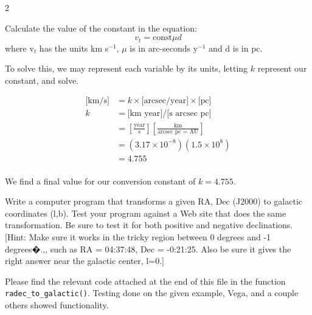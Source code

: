\documentclass[12pt]{article}
\newenvironment{problem}[2][Problem]{\begin{trivlist}
\item[\hskip \labelsep {\bfseries #1}\hskip \labelsep {\bfseries #2.}]}{\end{trivlist}}
\newenvironment{answer}[2][Answer]{\begin{trivlist}
\item[\hskip \labelsep {\bfseries #1}\hskip \labelsep {\bfseries #2.}]}{\end{trivlist}}
\begin{document}
\begin{multicols*}{2}
\bigskip \bigskip
\begin{problem}{2} Calculate the value of the constant in the equation:
$$v_t = \text{const} \mu d$$
where v$_t$ has the units km s$^{-1}$, $\mu$ is in arc-seconds y$^{-1}$ and d is in pc.
\end{problem}

\begin{answer}{2}

To solve this, we may represent each variable by its units, letting $k$ represent our constant, and solve.

\begin{align*}
  \text{[km/s]} &= k \times \text{[arcsec/year]} \times \text{[pc]} \\
  k &= \text{[km year]}/\text{[s arcsec pc]} \\
    &= [\frac{\text{year}}{\text{s}}] [\frac{\text{km}}{\text{arcsec pc = AU}}] \\
    &= (3.17 \times 10^{-8}) (1.5 \times 10^8) \\
    &= 4.755 \\
\end{align*}

We find a final value for our conversion constant of $k = 4.755$.

\end{answer}






\bigskip \bigskip
\begin{problem}{3} Write a computer program that transforms a given RA, Dec (J2000) to galactic coordinates (l,b). Test your program against a Web site that does the same transformation. Be sure to test it for both positive and negative declinations. [Hint: Make sure it works in the tricky region between 0 degrees and -1 degrees�.,, such as  RA = 04:37:48, Dec = -0:21:25. Also be sure it gives the right answer near the galactic center, l=0.]

\end{problem}

\begin{answer}{3}
Please find the relevant code attached at the end of this file in the function \texttt{radec\_to\_galactic()}. Testing done on the given example, Vega, and a couple others showed functionality.
\end{answer}






\end{multicols*}
\end{document}
